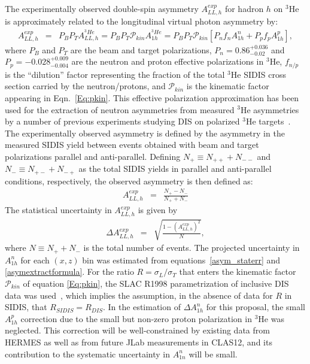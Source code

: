 \paragraph{}
The experimentally observed double-spin asymmetry $A_{LL,h}^{exp}$ for hadron $h$ on $^3$He is approximately related to the longitudinal virtual photon asymmetry by:
\begin{eqnarray}
  A_{LL,h}^{exp} &=& P_B P_T A_{LL,h}^{^3He} = P_B P_T \mathcal{P}_{kin} A_{1h}^{^3He} = P_B P_T \mathcal{P}_{kin} \left[P_n f_n A_{1h}^n + P_p f_p A_{1h}^p \right], \label{asymextractformula}
\end{eqnarray}
where $P_B$ and $P_T$ are the beam and target polarizations, $P_n = 0.86_{-0.02}^{+0.036}$ and $P_p = -0.028_{-0.004}^{+0.009}$ are the neutron and proton effective polarizations in $^3$He, $f_{n/p}$ is the ``dilution'' factor representing the fraction of the total $^3$He SIDIS cross section carried by the neutron/protons, and $\mathcal{P}_{kin}$ is the kinematic factor appearing in Eqn.~\eqref{Eq:pkin}. This effective polarization approximation has been used for the extraction of neutron asymmetries from measured $^3$He asymmetries by a number of previous experiments studying DIS on polarized $^3$He targets~\cite{E06010_AUT_PRL,E06010_ALT_PRL,A1N_PRL}. The experimentally observed asymmetry is defined by the asymmetry in the measured SIDIS yield between events obtained with beam and target polarizations parallel and anti-parallel. Defining $N_+ \equiv N_{++} + N_{--}$ and $N_{-} \equiv N_{+-} + N_{-+}$ as the total SIDIS yields in parallel and anti-parallel conditions, respectively, the observed asymmetry is then defined as:
\begin{eqnarray}
  A_{LL,h}^{exp} &=& \frac{N_+ - N_-}{N_+ + N_-}
\end{eqnarray}
The statistical uncertainty in $A_{LL,h}^{exp}$ is given by 
\begin{eqnarray}
  \Delta A_{LL,h}^{exp} &=& \sqrt{\frac{1-(A_{LL,h}^{exp})^2}{N}}, \label{asym_staterr}
\end{eqnarray}
where $N \equiv N_+ + N_-$ is the total number of events. The projected uncertainty in $A_{1h}^n$ for each $(x,z)$ bin was estimated from equations~\eqref{asym_staterr} and \eqref{asymextractformula}. For the ratio $R = \sigma_L/\sigma_T$ that enters the kinematic factor $\mathcal{P}_{kin}$ of equation \eqref{Eq:pkin}, the SLAC R1998 parametrization of inclusive DIS data was used~\cite{SLAC_R1998}, which implies the assumption, in the absence of data for $R$ in SIDIS, that $R_{SIDIS} = R_{DIS}$. In the estimation of $\Delta A_{1h}^n$ for this proposal, the small $A_{1h}^p$ correction due to the small but non-zero proton polarization in $^3$He was neglected. This correction will be well-constrained by existing data from HERMES as well as from future JLab measurements in CLAS12, and its contribution to the systematic uncertainty in $A_{1n}^n$ will be small.

